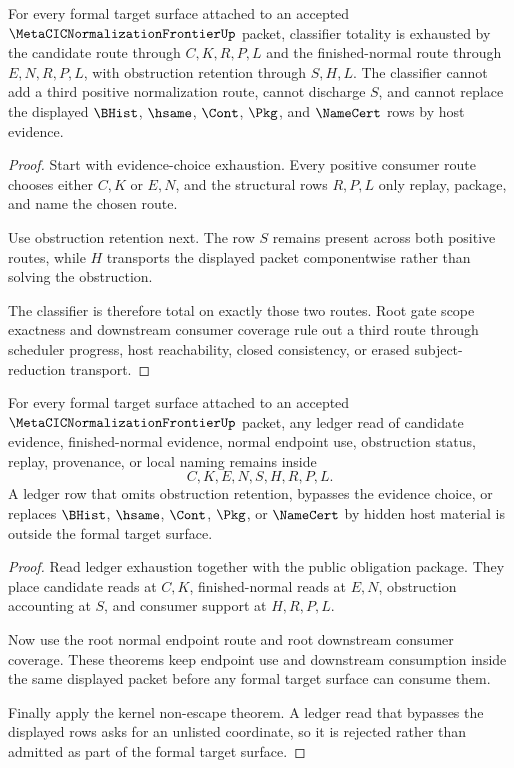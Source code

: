 \begin{theorem}
\label{thm:metacic-normalization-frontier-formal-target-classifier-totality}
For every formal target surface attached to an accepted $\MetaCICNormalizationFrontierUp$ packet, classifier totality is exhausted by the candidate route through $C,K,R,P,L$ and the finished-normal route through $E,N,R,P,L$, with obstruction retention through $S,H,L$. The classifier cannot add a third positive normalization route, cannot discharge $S$, and cannot replace the displayed $\BHist$, $\hsame$, $\Cont$, $\Pkg$, and $\NameCert$ rows by host evidence.
\end{theorem}
\begin{proof}
Start with evidence-choice exhaustion. Every positive consumer route chooses either $C,K$ or $E,N$, and the structural rows $R,P,L$ only replay, package, and name the chosen route.

Use obstruction retention next. The row $S$ remains present across both positive routes, while $H$ transports the displayed packet componentwise rather than solving the obstruction.

The classifier is therefore total on exactly those two routes. Root gate scope exactness and downstream consumer coverage rule out a third route through scheduler progress, host reachability, closed consistency, or erased subject-reduction transport.
\end{proof}

\begin{theorem}
\label{thm:metacic-normalization-frontier-formal-target-ledger-nonescape}
For every formal target surface attached to an accepted $\MetaCICNormalizationFrontierUp$ packet, any ledger read of candidate evidence, finished-normal evidence, normal endpoint use, obstruction status, replay, provenance, or local naming remains inside
$$
C,K,E,N,S,H,R,P,L.
$$
A ledger row that omits obstruction retention, bypasses the evidence choice, or replaces $\BHist$, $\hsame$, $\Cont$, $\Pkg$, or $\NameCert$ by hidden host material is outside the formal target surface.
\end{theorem}
\begin{proof}
Read ledger exhaustion together with the public obligation package. They place candidate reads at $C,K$, finished-normal reads at $E,N$, obstruction accounting at $S$, and consumer support at $H,R,P,L$.

Now use the root normal endpoint route and root downstream consumer coverage. These theorems keep endpoint use and downstream consumption inside the same displayed packet before any formal target surface can consume them.

Finally apply the kernel non-escape theorem. A ledger read that bypasses the displayed rows asks for an unlisted coordinate, so it is rejected rather than admitted as part of the formal target surface.
\end{proof}

